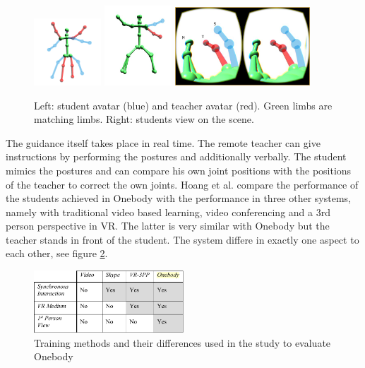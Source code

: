 \begin{figure}
	\centering
	\includegraphics[width=0.225\textwidth]{img/onebody1.png}
	\includegraphics[width=0.225\textwidth]{img/onebody2.png}
	\includegraphics[width=0.45\textwidth]{img/onebody3.png}
	\caption{Left: student avatar (blue) and teacher avatar (red). Green limbs are matching limbs. Right: students view on the scene.\cite{Hoang2016}}
	\label{fig:ob1}
\end{figure}
The guidance itself takes place in real time. The remote teacher can give instructions by performing the postures and additionally verbally. The student mimics the postures and can compare his own joint positions with the positions of the teacher to correct the own joints. Hoang et al. compare the performance of the students achieved in Onebody with the performance in three other systems, namely with traditional video based learning, video conferencing and a 3rd person perspective in VR. The latter is very similar with Onebody but the teacher stands in front of the student. The system differe in exactly one aspect to each other, see figure \ref{fig:ob2}.
\begin{figure}
	\centering
	\includegraphics[width=0.5\textwidth]{img/onebody_training_methods.PNG}
	\caption{Training methods and their differences used in the study to evaluate Onebody \cite{Hoang2016}}
	\label{fig:ob2}
\end{figure}
